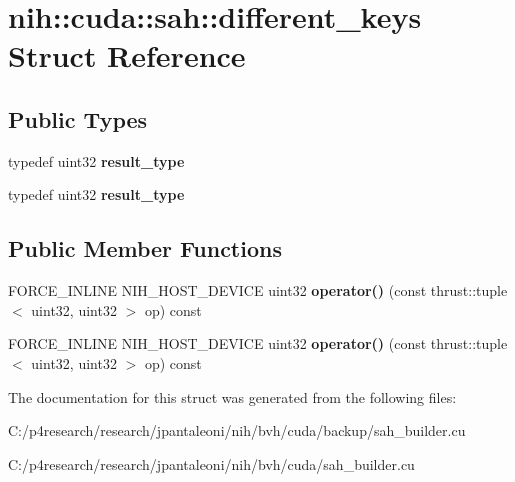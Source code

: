 \hypertarget{structnih_1_1cuda_1_1sah_1_1different__keys}{
\section{nih\-:\-:cuda\-:\-:sah\-:\-:different\-\_\-keys \-Struct \-Reference}
\label{structnih_1_1cuda_1_1sah_1_1different__keys}
}
\subsection*{\-Public \-Types}
\begin{DoxyCompactItemize}
\item 
\hypertarget{structnih_1_1cuda_1_1sah_1_1different__keys_ae76a9565840a05be88a37de3abb83528}{
typedef uint32 {\bfseries result\-\_\-type}}
\label{structnih_1_1cuda_1_1sah_1_1different__keys_ae76a9565840a05be88a37de3abb83528}

\item 
\hypertarget{structnih_1_1cuda_1_1sah_1_1different__keys_ae76a9565840a05be88a37de3abb83528}{
typedef uint32 {\bfseries result\-\_\-type}}
\label{structnih_1_1cuda_1_1sah_1_1different__keys_ae76a9565840a05be88a37de3abb83528}

\end{DoxyCompactItemize}
\subsection*{\-Public \-Member \-Functions}
\begin{DoxyCompactItemize}
\item 
\hypertarget{structnih_1_1cuda_1_1sah_1_1different__keys_a3bb3f7f47e82a3c2e8b22b0b1aaa9783}{
\-F\-O\-R\-C\-E\-\_\-\-I\-N\-L\-I\-N\-E \-N\-I\-H\-\_\-\-H\-O\-S\-T\-\_\-\-D\-E\-V\-I\-C\-E uint32 {\bfseries operator()} (const thrust\-::tuple$<$ uint32, uint32 $>$ op) const }
\label{structnih_1_1cuda_1_1sah_1_1different__keys_a3bb3f7f47e82a3c2e8b22b0b1aaa9783}

\item 
\hypertarget{structnih_1_1cuda_1_1sah_1_1different__keys_a3bb3f7f47e82a3c2e8b22b0b1aaa9783}{
\-F\-O\-R\-C\-E\-\_\-\-I\-N\-L\-I\-N\-E \-N\-I\-H\-\_\-\-H\-O\-S\-T\-\_\-\-D\-E\-V\-I\-C\-E uint32 {\bfseries operator()} (const thrust\-::tuple$<$ uint32, uint32 $>$ op) const }
\label{structnih_1_1cuda_1_1sah_1_1different__keys_a3bb3f7f47e82a3c2e8b22b0b1aaa9783}

\end{DoxyCompactItemize}


\-The documentation for this struct was generated from the following files\-:\begin{DoxyCompactItemize}
\item 
\-C\-:/p4research/research/jpantaleoni/nih/bvh/cuda/backup/sah\-\_\-builder.\-cu\item 
\-C\-:/p4research/research/jpantaleoni/nih/bvh/cuda/sah\-\_\-builder.\-cu\end{DoxyCompactItemize}
